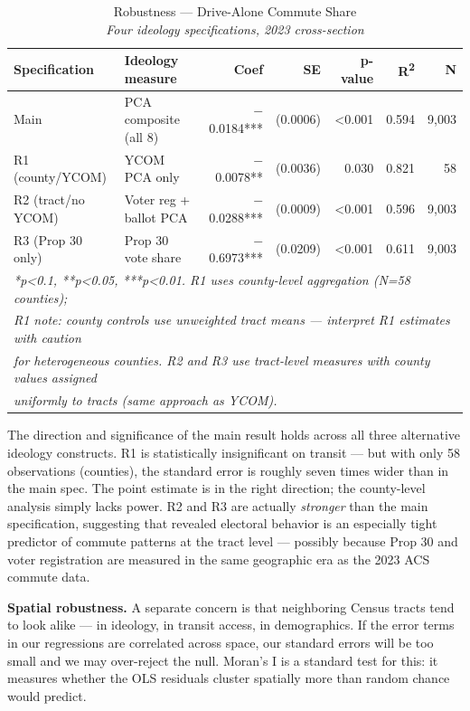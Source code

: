 \documentclass[12pt]{article}
\begin{document}
\begin{table}[H]
\centering
\caption{Robustness --- Drive-Alone Commute Share\\
\small\textit{Four ideology specifications, 2023 cross-section}}
\small
\begin{tabular}{p{3.0cm}p{3.8cm}rrrr r}
\toprule
Specification & Ideology measure & Coef & SE & p-value & R\textsuperscript{2} & N \\
\midrule
Main             & PCA composite (all 8)  & $-$0.0184*** & (0.0006) & <0.001 & 0.594 & 9,003 \\
R1 (county/YCOM) & YCOM PCA only          & $-$0.0078**  & (0.0036) & 0.030  & 0.821 &    58 \\
R2 (tract/no YCOM) & Voter reg + ballot PCA & $-$0.0288*** & (0.0009) & <0.001 & 0.596 & 9,003 \\
R3 (Prop 30 only)  & Prop 30 vote share   & $-$0.6973*** & (0.0209) & <0.001 & 0.611 & 9,003 \\
\bottomrule
\multicolumn{7}{l}{\footnotesize \textit{*p<0.1, **p<0.05, ***p<0.01. R1 uses county-level aggregation (N=58 counties);}} \\
\multicolumn{7}{l}{\footnotesize \textit{R1 note: county controls use unweighted tract means --- interpret R1 estimates with caution}} \\
\multicolumn{7}{l}{\footnotesize \textit{for heterogeneous counties. R2 and R3 use tract-level measures with county values assigned}} \\
\multicolumn{7}{l}{\footnotesize \textit{uniformly to tracts (same approach as YCOM).}} \\
\end{tabular}
\normalsize
\end{table}

The direction and significance of the main result holds across all three alternative
ideology constructs. R1 is statistically insignificant on transit --- but with only 58
observations (counties), the standard error is roughly seven times wider than in the
main spec. The point estimate is in the right direction; the county-level analysis simply
lacks power. R2 and R3 are actually \textit{stronger} than the main specification,
suggesting that revealed electoral behavior is an especially tight predictor of commute
patterns at the tract level --- possibly because Prop 30 and voter registration are measured
in the same geographic era as the 2023 ACS commute data.

\textbf{Spatial robustness.} A separate concern is that neighboring Census tracts
tend to look alike --- in ideology, in transit access, in demographics. If the error terms
in our regressions are correlated across space, our standard errors will be too small and
we may over-reject the null. Moran's I is a standard test for this: it measures whether
the OLS residuals cluster spatially more than random chance would predict.
\end{document}
